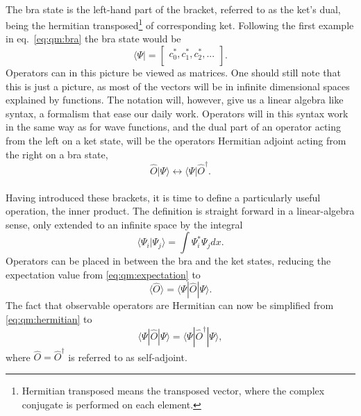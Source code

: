 \paragraph*{}
The bra state is the left-hand part of the bracket, referred to as the ket's dual, being the hermitian transposed\footnote{Hermitian transposed means the transposed vector, where the complex conjugate is performed on each element.} of corresponding ket.
Following the first example in eq.~\eqref{eq:qm:bra} the bra state would be
\begin{equation}
\langle \Psi | =
\begin{bmatrix}
c_0^{*}, c_1^{*}, c_2^{*}, ... \\
\end{bmatrix}.
\end{equation}
Operators can in this picture be viewed as matrices.
One should still note that this is just a picture, as 
most of the vectors will be in infinite dimensional spaces explained by
functions.
The notation will, however, give us a linear algebra like syntax, a formalism
that ease our daily work.
Operators will in this syntax work in the same way as for wave functions, and the dual part of an operator acting from the left on a ket state, will be the operators Hermitian adjoint acting from the right on a bra state,
\begin{equation}
\hat{O}|\Psi \rangle  \longleftrightarrow  \langle \Psi | \hat{O}^{\dagger} .
\end{equation}

\paragraph*{}
Having introduced these brackets, it is time to define a particularly useful
operation, the inner product.
The definition is straight forward in a linear-algebra sense, only extended to
an infinite space by the integral 
\begin{equation}
\langle \Psi_i | \Psi_j \rangle =
\int \Psi_i^{*} \Psi_j dx .
\end{equation}
Operators can be placed in between the bra and the ket states, reducing the expectation value
from \eqref{eq:qm:expectation} to
\begin{equation}
\langle \hat{O} \rangle = 
\langle \Psi | \hat{O} | \Psi \rangle .
\end{equation}
The fact that observable operators are Hermitian can now be simplified from
\eqref{eq:qm:hermitian} to 
\begin{equation}
\langle \Psi | \hat{O} | \Psi \rangle = \langle \Psi | \hat{O}^{\dagger} | \Psi \rangle,
\end{equation}
where $\hat{O} = \hat{O}^{\dagger}$ is referred to as self-adjoint.



